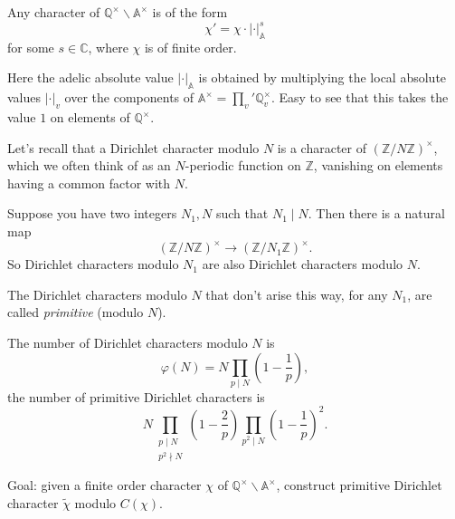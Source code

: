 \documentclass[reqno]{amsart} 
\begin{document}
\begin{exercise}
  Any character of $\mathbb{Q}^\times \backslash \mathbb{A}^\times$ is of the form
  \begin{equation*}
    \chi ' = \chi \cdot \lvert \cdot \rvert_{\mathbb{A}}^s
  \end{equation*}
  for some $s \in \mathbb{C}$, where $\chi$ is of finite order.
\end{exercise}
Here the adelic absolute value $\lvert \cdot \rvert_{\mathbb{A}}$ is obtained by multiplying the local absolute values $\lvert \cdot \rvert_{v}$ over the components of $\mathbb{A}^\times = \prod_v ' \mathbb{Q}_v^\times$.  Easy to see that this takes the value $1$ on elements of $\mathbb{Q}^\times$.

Let's recall that a Dirichlet character modulo $N$ is a character of $(\mathbb{Z} / N \mathbb{Z})^\times$, which we often think of as an $N$-periodic function on $\mathbb{Z}$, vanishing on elements having a common factor with $N$.

Suppose you have two integers $N_1, N$ such that $N_1 \mid N$.  Then there is a natural map
\begin{equation*}
  (\mathbb{Z} / N \mathbb{Z})^\times \rightarrow
  (\mathbb{Z} / N_1 \mathbb{Z})^\times.
\end{equation*}
So Dirichlet characters modulo $N_1$ are also Dirichlet characters modulo $N$.

The Dirichlet characters modulo $N$ that don't arise this way, for any $N_1$, are called \emph{primitive} (modulo $N$).

\begin{remark}
  The number of Dirichlet characters modulo $N$ is 
  \begin{equation*}
    \varphi(N) = N \prod_{p \mid N} \left( 1 - \frac{1}{p} \right),
  \end{equation*}
  the number of primitive Dirichlet characters is
  \begin{equation*}
    N \prod_{
      \substack{
        p \mid N  \\
        p^2 \nmid N        
      }
    } \left( 1 - \frac{2}{p} \right)
    \prod_{p^2 \mid N}
    \left( 1 - \frac{1}{p} \right)^2.
  \end{equation*}
\end{remark}

Goal: given a finite order character $\chi$ of $\mathbb{Q}^\times \backslash \mathbb{A}^\times$, construct primitive Dirichlet character $\tilde{\chi}$ modulo $C(\chi)$.
\end{document}

